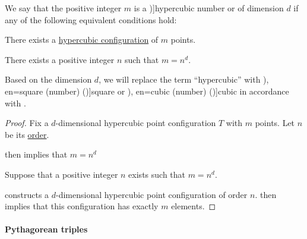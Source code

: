 \begin{definition}\label{def:hypercubic_number}
  We say that the positive integer \( m \) is a \term[en=hypercube number (\cite[\S 3.2.4]{Deza2012FigurateNumbers})]{hypercubic number} or  of dimension \( d \) if any of the following equivalent conditions hold:
  \begin{thmenum}
    \mimprovised There exists a \hyperref[def:hypercubic_point_configuration]{hypercubic configuration} of \( m \) points.

     There exists a positive integer \( n \) such that \( m = n^d \).
  \end{thmenum}

  Based on the dimension \( d \), we will replace the term \enquote{hypercubic} with \term[ru=квадратное (число) (\cite[14]{АлександровМаркушевичХинчин1963ЭнциклопедияТом4}), en=square (number) (\cite[1]{Deza2012FigurateNumbers})]{square} or \term[ru=кубическое (число) (\cite[14]{АлександровМаркушевичХинчин1963ЭнциклопедияТом4}), en=cubic (number) (\cite[1]{Deza2012FigurateNumbers})]{cubic} in accordance with .
\end{definition}
\begin{proof}
   Fix a \( d \)-dimensional hypercubic point configuration \( T \) with \( m \) points. Let \( n \) be its \hyperref[def:hypercubic_point_configuration_order]{order}.

   then implies that \( m = n^d \)

   Suppose that a positive integer \( n \) exists such that \( m = n^d \).

   constructs a \( d \)-dimensional hypercubic point configuration of order \( n \).  then implies that this configuration has exactly \( m \) elements.
\end{proof}

\paragraph{Pythagorean triples}

